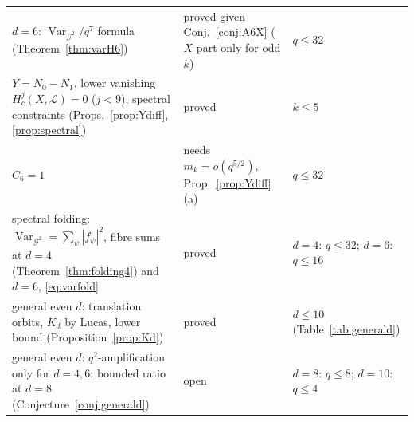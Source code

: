 \documentclass[11pt,a4paper]{amsart}
\theoremstyle{definition}
\newcommand{\G}{\mathcal{G}}
\newcommand{\Var}{\operatorname{Var}}
\begin{document}
\begin{table}[H]
\begin{tabular}{@{}p{}p{}p{}@{}}
$d=6$: $\Var_{\G^2}/q^7$ formula (Theorem~\ref{thm:varH6}) & proved given Conj.~\ref{conj:A6X} ($X$-part only for odd $k$) & $q\le32$\\
$Y=N_0-N_1$, lower vanishing $H^j_c(X,\mathcal L)=0$ ($j<9$), spectral constraints (Props.~\ref{prop:Ydiff}, \ref{prop:spectral}) & proved & $k\le5$\\
$C_6=1$ & \raggedright\arraybackslash needs $m_k=o(q^{5/2})$, Prop.~\ref{prop:Ydiff}(a) & $q\le32$\\
spectral folding: $\Var_{\G^2}=\sum_\psi|f_\psi|^2$, fibre sums at $d=4$ (Theorem~\ref{thm:folding4}) and $d=6$, \eqref{eq:varfold} & proved & $d=4$: $q\le32$; $d=6$: $q\le16$\\
general even $d$: translation orbits, $K_d$ by Lucas, lower bound (Proposition~\ref{prop:Kd}) & proved & $d\le10$ (Table~\ref{tab:generald})\\
general even $d$: $q^2$-amplification only for $d=4,6$; bounded ratio at $d=8$ (Conjecture~\ref{conj:generald}) & open & $d=8$: $q\le8$; $d=10$: $q\le4$\\
\bottomrule
\end{tabular}
\end{table}
\end{document}

